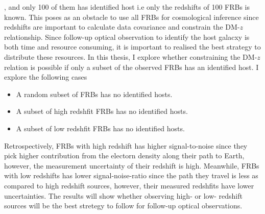 \begin{itemize}
{}, and only 100 of them has identified host \citep{Reischke:2025srr} i.e only the redshifts of 100 FRBs is known. This poses as an obstacle to use all FRBs for cosmological inference since redshifts are important to calculate data covariance and constrain the DM-$z$ relationship. Since follow-up optical observation to identify the host galacxy is both time and resource consuming, it is important to realised the best strategy to distribute these resources. 
In this thesis, I explore whether constraining the DM-$z$ relation is possible if only a subset of the observed FRBs has an identified host. I explore the following cases
\begin{itemize}
    \item A random subset of FRBs has no identified hosts.
    \item A subset of high redshfit FRBs has no identified hosts. 
    \item A subset of low redshfit FRBs has no identified hosts.
\end{itemize}
Retrospectively, FRBs with high redshift has higher signal-to-noise since they pick higher contribution from the electorn density along their path to Earth, however, the measurement uncertainty of their redshift is high. Meanwhile, FRBs with low redshifts has lower signal-noise-ratio since the path they travel is less as compared to high redshift sources, however, their measured redshfits have lower uncertainties. The results will show whether observing high- or low- redshift sources will be the best stretegy to follow for follow-up optical observations. 
\end{itemize}
